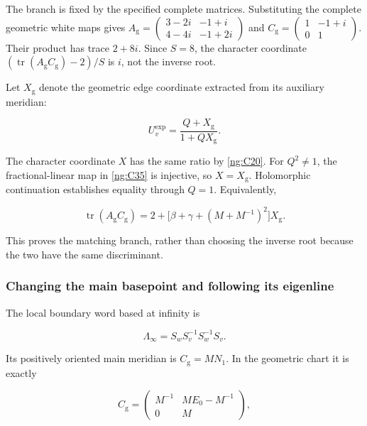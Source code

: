 The branch is fixed by the specified complete matrices. Substituting the complete geometric white maps gives
\(A_{\mathrm g}=\left(\begin{smallmatrix}3-2i&-1+i\\4-4i&-1+2i\end{smallmatrix}\right)\)
and
\(C_{\mathrm g}=\left(\begin{smallmatrix}1&-1+i\\0&1\end{smallmatrix}\right)\).
Their product has trace \(2+8i\). Since \(S=8\), the character coordinate \((\operatorname{tr}(A_{\mathrm g}C_{\mathrm g})-2)/S\) is \(i\), not the inverse root.

Let \(X_{\mathrm g}\) denote the geometric edge coordinate extracted from its auxiliary meridian:

\begin{equation}\label{ng:C35}
U_v^{\exp}=\frac{Q+X_{\mathrm g}}{1+QX_{\mathrm g}}.
\end{equation}

The character coordinate \(X\) has the same ratio by \eqref{ng:C20}. For \(Q^2\ne1\), the fractional-linear map in \eqref{ng:C35} is injective, so \(X=X_{\mathrm g}\). Holomorphic continuation establishes equality through \(Q=1\). Equivalently,

\begin{equation}\label{ng:C36}
\operatorname{tr}(A_{\mathrm g}C_{\mathrm g})
       =2+\bigl[\beta+\gamma+(M+M^{-1})^2\bigr]X_{\mathrm g}.
\end{equation}

This proves the matching branch, rather than choosing the inverse root because the two have the same discriminant.

\subsubsection{Changing the main basepoint and following its eigenline}\label{ng:main-basepoint-selected-flag-and-negative-lift}

The local boundary word based at infinity is

\begin{equation}\label{ng:C37}
\Lambda_\infty=S_wS_v^{-1}S_w^{-1}S_v.
\end{equation}

Its positively oriented main meridian is \(C_{\mathrm g}=MN_1\). In the geometric chart it is exactly

\begin{equation}\label{ng:C38}
C_{\mathrm g}=
 \begin{pmatrix}
 M^{-1}&M E_0-M^{-1}\\0&M
 \end{pmatrix},
\end{equation}


